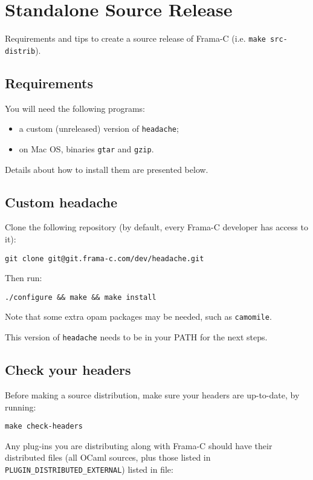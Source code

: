 \appendix

\chapter{Standalone Source Release}
\label{chap:make-src-distrib}

Requirements and tips to create a source release of Frama-C
(i.e. \texttt{make src-distrib}).

\section{Requirements}

You will need the following programs:

\begin{itemize}
\item a custom (unreleased) version of \texttt{headache};
\item on Mac OS, binaries \texttt{gtar} and \texttt{gzip}.
\end{itemize}

Details about how to install them are presented below.

\section{Custom headache}

Clone the following repository (by default, every Frama-C developer has
access to it):

\texttt{git clone git@git.frama-c.com/dev/headache.git}

Then run:

\verb+./configure && make && make install+

Note that some extra opam packages may be needed, such as \texttt{camomile}.

This version of \texttt{headache} needs to be in your PATH for the next steps.

\section{Check your headers}

Before making a source distribution, make sure your headers are up-to-date,
by running:

\texttt{make check-headers}

Any plug-ins you are distributing along with Frama-C should have their
distributed files (all OCaml sources, plus those listed in
\verb+PLUGIN_DISTRIBUTED_EXTERNAL+) listed in file:

